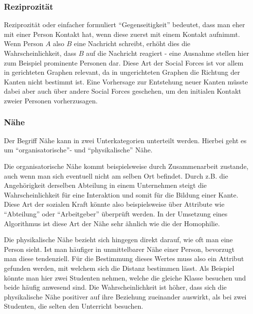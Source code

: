 \subsubsection{Reziprozität}
Reziprozität oder einfacher formuliert ``Gegenseitigkeit'' bedeutet, dass man eher mit einer Person Kontakt hat, wenn
diese zuerst mit einem Kontakt aufnimmt. Wenn Person $A$ also $B$ eine Nachricht schreibt, erhöht dies die Wahrscheinlichkeit, dass $B$ auf
die Nachricht reagiert - eine Ausnahme stellen hier zum Beispiel prominente Personen dar.
Diese Art der Social Forces ist vor allem in gerichteten Graphen relevant, da in ungerichteten Graphen die
Richtung der Kanten nicht bestimmt ist. Eine Vorhersage zur Entstehung neuer Kanten müsste dabei aber auch über
andere Social Forces geschehen, um den initialen Kontakt zweier Personen vorherzusagen.

\subsubsection{Nähe}
Der Begriff Nähe kann in zwei Unterkategorien unterteilt werden. Hierbei geht es um ``organisatorische''- und
``physikalische'' Nähe.

Die organisatorische Nähe kommt beispielsweise durch Zusammenarbeit zustande, auch wenn man sich eventuell nicht
am selben Ort befindet. Durch z.B. die Angehörigkeit derselben Abteilung in einem Unternehmen steigt die Wahrscheinlichkeit
für eine Interaktion und somit für die Bildung einer Kante. Diese Art der sozialen Kraft könnte also beispielsweise
über Attribute wie ``Abteilung'' oder ``Arbeitgeber'' überprüft werden. In der Umsetzung eines Algorithmus ist diese Art der
Nähe sehr ähnlich wie die der Homophilie.

Die physikalische Nähe bezieht sich hingegen direkt darauf, wie oft man eine Person sieht. Ist man häufiger in
unmittelbarer Nähe einer Person, bevorzugt man diese tendenziell. Für die Bestimmung dieses Wertes muss also ein Attribut
gefunden werden, mit welchem sich die Distanz bestimmen lässt. Als Beispiel könnte man hier zwei Studenten nehmen,
welche die gleiche Klasse besuchen und beide häufig anwesend sind. Die Wahrscheinlichkeit ist höher, dass sich die
physikalische Nähe positiver auf ihre Beziehung zueinander auswirkt, als bei zwei Studenten, die selten den Unterricht besuchen.

